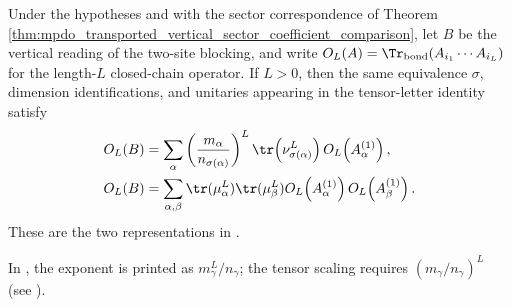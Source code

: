 \begin{lemma}
    \label{thm:mpdo_blocked_vertical_operator_representations}
    \leanok
    Under the hypotheses and with the sector correspondence of Theorem~
    \ref{thm:mpdo_transported_vertical_sector_coefficient_comparison}, let
    $B$ be the vertical reading of the two-site blocking, and write
    $O_L(A)=\Tr_{\mathrm{bond}}(A_{i_1}\cdots A_{i_L})$
    for the length-$L$ closed-chain operator. If $L>0$, then the same
    equivalence $\sigma$, dimension identifications, and unitaries appearing
    in the tensor-letter identity satisfy
    \begin{align}
        O_L(B)
         & =\sum_\alpha
        \left(\frac{m_\alpha}{n_{\sigma(\alpha)}}\right)^L
        \tr\!\left(\nu_{\sigma(\alpha)}^L\right)
        O_L\!\left(A^{(1)}_\alpha\right),
        \label{eq:mpdo_blocked_vertical_op_reparam} \\
        O_L(B)
         & =\sum_{\alpha,\beta}
        \tr(\mu_\alpha^L)
        \tr(\mu_\beta^L)
        O_L\!\left(A^{(1)}_\alpha\right)
        O_L\!\left(A^{(1)}_\beta\right).
        \label{eq:mpdo_blocked_vertical_op_product}
    \end{align}
    These are the two representations in
    \cite[Appendix~C.4, lines~2011--2018]{Cirac2016MPDO_arXiv}.

    In \cite[Appendix~C.4, line~2013]{Cirac2016MPDO_arXiv}, the exponent is
    printed as $m_\gamma^L/n_\gamma$; the tensor scaling requires
    $(m_\gamma/n_\gamma)^L$ (see
    \cite{gap:cpsv16_blocked_operator_trace_ratio_exponent}).
\end{lemma}


